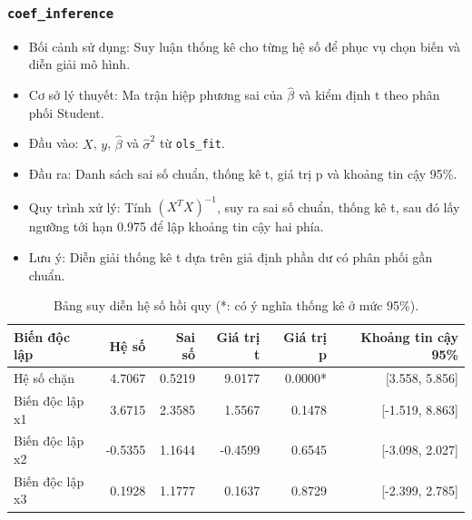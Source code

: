 \documentclass[a4paper]{article}
\newcommand{\code}[1]{\colorbox{light-gray}{\texttt{#1}}}
\begin{document}
\subsubsection{\code{coef\_inference}}
\begin{itemize}[leftmargin=*]
    \item Bối cảnh sử dụng: Suy luận thống kê cho từng hệ số để phục vụ chọn biến và diễn giải mô hình.
    \item Cơ sở lý thuyết: Ma trận hiệp phương sai của $\hat{\beta}$ và kiểm định t theo phân phối Student.
    \item Đầu vào: $X$, $y$, $\hat{\beta}$ và $\hat{\sigma}^2$ từ \texttt{ols\_fit}.
    \item Đầu ra: Danh sách sai số chuẩn, thống kê t, giá trị p và khoảng tin cậy 95\%.
    \item Quy trình xử lý: Tính $(X^T X)^{-1}$, suy ra sai số chuẩn, thống kê t, sau đó lấy ngưỡng tới hạn 0.975 để lập khoảng tin cậy hai phía.
    \item Lưu ý: Diễn giải thống kê t dựa trên giả định phần dư có phân phối gần chuẩn.
\end{itemize}
\begin{table}[H]
    \centering
    \small
    \begin{tabular}{lrrrrr}
    \toprule
    \textbf{Biến độc lập} & \textbf{Hệ số} & \textbf{Sai số} & \textbf{Giá trị t} & \textbf{Giá trị p} & \textbf{Khoảng tin cậy 95\%} \\
    \midrule
    Hệ số chặn & 4.7067 & 0.5219 & 9.0177 & 0.0000* & [3.558, 5.856] \\
    Biến độc lập x1 & 3.6715 & 2.3585 & 1.5567 & 0.1478 & [-1.519, 8.863] \\
    Biến độc lập x2 & -0.5355 & 1.1644 & -0.4599 & 0.6545 & [-3.098, 2.027] \\
    Biến độc lập x3 & 0.1928 & 1.1777 & 0.1637 & 0.8729 & [-2.399, 2.785] \\
    \bottomrule
    \end{tabular}
    \caption{Bảng suy diễn hệ số hồi quy (*: có ý nghĩa thống kê ở mức 95\%).}
\end{table}
\end{document}
